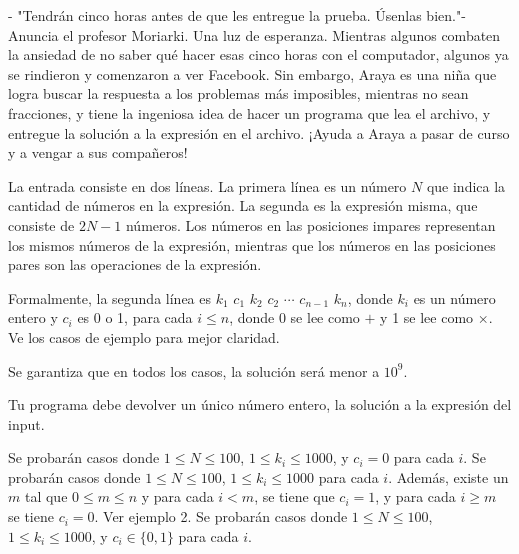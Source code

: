 \documentclass{oci}
\begin{document}
\begin{problemDescription}
- "Tendrán cinco horas antes de que les entregue la prueba. Úsenlas bien."- Anuncia el profesor Moriarki. Una luz de esperanza. Mientras algunos combaten la ansiedad de no saber qué hacer esas cinco horas con el computador, algunos ya se rindieron y comenzaron a ver Facebook. Sin embargo, Araya es una niña que logra buscar la respuesta a los problemas más imposibles, mientras no sean fracciones, y tiene la ingeniosa idea de hacer un programa que lea el archivo, y entregue la solución a la expresión en el archivo. ¡Ayuda a Araya a pasar de curso y a vengar a sus compañeros!

\end{problemDescription}

\begin{inputDescription}
La entrada consiste en dos líneas. La primera línea es un número $N$ que indica la cantidad de números en la expresión. La segunda es la expresión misma, que consiste de $2N-1$ números. Los números en las posiciones impares representan los mismos números de la expresión, mientras que los números en las posiciones pares son las operaciones de la expresión. 

Formalmente, la segunda línea es $k_1$ $c_1$ $k_2$ $c_2$ $\cdots$ $c_{n-1}$ $k_n$, donde $k_i$ es un número entero y $c_i$ es 0 o 1, para cada $i \leq n$, donde 0 se lee como $+$ y 1 se lee como $\times$. Ve los casos de ejemplo para mejor claridad.

Se garantiza que en todos los casos, la solución será menor a $10^9$.
\end{inputDescription}

\begin{outputDescription}
Tu programa debe devolver un único número entero, la solución a la expresión del input.
\end{outputDescription}

\begin{scoreDescription}
   Se probarán casos donde $1 \leq N \leq 100$, $1\leq k_i \leq 1000$, y $c_i = 0$ para cada $i$.
   Se probarán casos donde $1 \leq N \leq 100$, $1\leq k_i \leq 1000$ para cada $i$. Además, existe un $m$ tal que $0 \leq m \leq n$ y para cada $i < m$, se tiene que $c_i = 1$, y para cada $i \geq m$ se tiene $c_i = 0$. Ver ejemplo 2.
   Se probarán casos donde $1 \leq N \leq 100$, $1\leq k_i \leq 1000$, y $c_i \in \{0,1\}$ para cada $i$.
\end{scoreDescription}

\begin{sampleDescription}
\end{sampleDescription}
\end{document}
